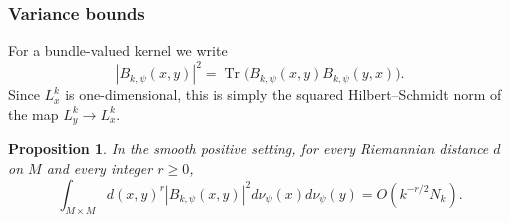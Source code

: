 \documentclass[12pt,a4paper,reqno]{article}
\theoremstyle{thmstyleone}
\newtheorem{theorem}{Theorem}[subsection]
\newtheorem{proposition}[theorem]{Proposition}
\theoremstyle{thmstylethree}
\theoremstyle{thmstyletwo}
\numberwithin{equation}{subsection}
\def\geq{\geqslant}
\begin{document}


\subsubsection{Variance bounds}

For a bundle-valued kernel we write
\[
    |B_{k,\psi}(x,y)|^2
    =
    \operatorname{Tr}\bigl(B_{k,\psi}(x,y)B_{k,\psi}(y,x)\bigr).
\]
Since $L_x^k$ is one-dimensional, this is simply the squared Hilbert--Schmidt norm of the map $L_y^k\to L_x^k$.

\begin{proposition}\label{prop:quadratic-localization}
In the smooth positive setting, for every Riemannian distance $d$ on $M$ and every integer $r\geq 0$,
\[
    \int_{M\times M}
    d(x,y)^r |B_{k,\psi}(x,y)|^2
    d\nu_\psi(x)d\nu_\psi(y)
    =
    O(k^{-r/2}N_k).
\]
\end{proposition}
\end{document}
